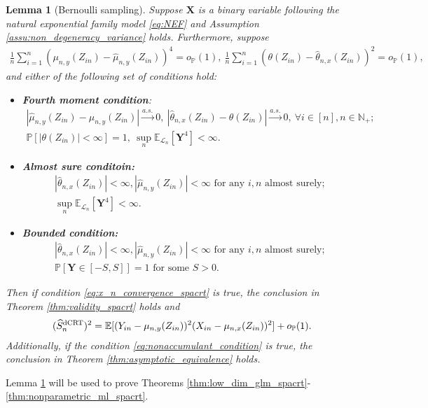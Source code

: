 \documentclass[12pt]{article}
\newtheorem{lemma}{Lemma}
\theoremstyle{definition}
\def\P{\mathbb{P}}
\def\P{\mathbb{P}}
\newcommand{\E}{\mathbb E}								%
\renewcommand{\P}{\mathbb{P}}							%
\newcommand{\prx}{\bm X}								%
\newcommand{\srx}{X}									%
\newcommand{\srz}{Z}									%
\newcommand{\pry}{{\bm Y}}								%
\newcommand{\sry}{Y}									%
\newcommand{\law}{\mathcal L}							%
\newcommand{\dCRT}{\textnormal{dCRT}} 					%
\begin{document}
\begin{lemma}[Bernoulli sampling]\label{lem:bernoulli_case}
	Suppose $\prx$ is a binary variable following the natural exponential family model \eqref{eq:NEF} and Assumption \ref{assu:non_degeneracy_variance} holds. Furthermore, suppose 
	\begin{align}\label{eq:Lyap-consistency}
		\frac{1}{n}\sum_{i=1}^n (\mu_{n,y}(\srz_{in})-\widehat{\mu}_{n,y}(\srz_{in}))^{4}=o_{\P}(1),\ \frac{1}{n}\sum_{i=1}^n (\theta(\srz_{in})-\widehat \theta_{n,x}(\srz_{in}))^{2}=o_{\P}(1),
	\end{align}
  and either of the following set of conditions hold:
  \begin{itemize}
    \item \textbf{Fourth moment condition}: 
    \begin{align}
      |\widehat{\mu}_{n,y}(\srz_{in})-\mu_{n,y}(\srz_{in})|\overset{a.s.}{\rightarrow}0,\ |\widehat \theta_{n,x}(\srz_{in})-\theta(\srz_{in})|\overset{a.s.}{\rightarrow}0,\ \forall i\in [n],n\in\mathbb{N}_+\label{eq:almost-sure-convergence};\\
      \P[|\theta(\srz_{in})|<\infty]=1,\ \sup_n\E_{\law_n}[\pry^4]<\infty\label{eq:bounded_moment_y}.
    \end{align}
    \item \textbf{Almost sure conditoin:}
    \begin{align}
      |\widehat \theta_{n,x}(\srz_{in})|<\infty,|\widehat \mu_{n,y}(\srz_{in})|<\infty\text{ for any $i,n$ almost surely};\label{eq:almost_sure_bound_NB_case}\\
      \sup_n\E_{\law_n}[\pry^4]<\infty\label{eq:bounded_moment_y_NB_case}.
    \end{align}
    \item \textbf{Bounded condition:}
    \begin{align}
      |\widehat \theta_{n,x}(\srz_{in})|<\infty,|\widehat \mu_{n,y}(\srz_{in})|<\infty\text{ for any $i,n$ almost surely};\label{eq:almost_sure_bound}\\
      \P[\pry\in[-S,S]]=1\text{ for some }S>0.\label{eq:compact_support_y}
    \end{align}
  \end{itemize}
	Then if condition \eqref{eq:x_n_convergence_spacrt} is true, the conclusion in Theorem \ref{thm:validity_spacrt} holds and 
  \begin{align}\label{eq:dCRT_variance_convergence}
    (\widehat{S}_n^{\dCRT})^2=\E[(\sry_{in}-\mu_{n,y}(\srz_{in}))^2(\srx_{in}-\mu_{n,x}(\srz_{in}))^2]+o_{\P}(1).
  \end{align}
  Additionally, if the condition \eqref{eq:nonaccumulant_condition} is true, the conclusion in Theorem \ref{thm:asymptotic_equivalence} holds.
\end{lemma}
\noindent Lemma \ref{lem:bernoulli_case} will be used to prove Theorems \ref{thm:low_dim_glm_spacrt}-\ref{thm:nonparametric_ml_spacrt}.
\end{document}
